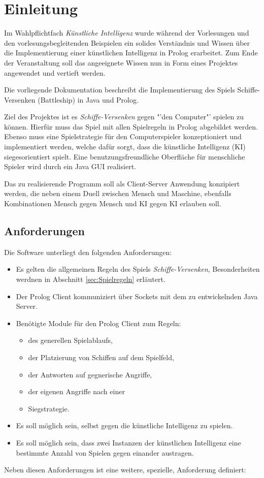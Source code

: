 \section{Einleitung}
\label{sec:Einleitung}
	Im Wahlpflichtfach \textit{Künstliche Intelligenz} wurde während der Vorlesungen und den vorlesungsbegleitenden Beispielen 
	ein solides Verständnis und Wissen über die Implementierung einer künstlichen Intelligenz 
	in Prolog erarbeitet. Zum Ende der Veranstaltung soll das angeeignete Wissen nun in 
	Form eines Projektes angewendet und vertieft werden.
	
	Die vorliegende Dokumentation beschreibt die Implementierung des Spiels Schiffe-Versenken (Battleship)
	in Java und Prolog.
	
	Ziel des Projektes ist es \textit{Schiffe-Versenken} gegen "'den Computer"' spielen zu können. Hierfür muss das Spiel mit allen Spielregeln 
	in Prolog abgebildet werden. Ebenso muss eine Spielstrategie für den Computerspieler konzeptioniert und implementiert werden, 
	welche dafür sorgt, dass die künstliche Intelligenz (KI) siegesorientiert spielt. 
	Eine benutzungsfreundliche Oberfläche für menschliche Spieler wird durch ein Java GUI realisiert.
	
	Das zu realisierende Programm soll als Client-Server Anwendung konzipiert werden, die neben einem Duell zwischen Mensch und Maschine, ebenfalls
	Kombinationen Mensch gegen Mensch und KI gegen KI erlauben soll.
	
	\subsection{Anforderungen} %
	\label{sub:anforderungen}
		Die Software unterliegt den folgenden Anforderungen:
		\begin{itemize}
			\item Es gelten die allgemeinen Regeln des Spiels \textit{Schiffe-Versenken}, Besonderheiten werdnen in Abschnitt \ref{sec:Spielregeln} erläutert.
			\item Der Prolog Client kommuniziert über Sockets mit dem zu entwickelnden Java Server.
			\item Benötigte Module für den Prolog Client zum Regeln:
			\begin{itemize}
				\item des generellen Spielablaufs,
				\item der Platzierung von Schiffen auf dem Spielfeld,
				\item der Antworten auf gegnerische Angriffe,
				\item der eigenen Angriffe nach einer 
				\item Siegstrategie.
			\end{itemize}
			\item Es soll möglich sein, selbst gegen die künstliche Intelligenz zu spielen.
			\item Es soll möglich sein, dass zwei Instanzen der künstlichen Intelligenz eine bestimmte Anzahl von Spielen gegen einander 
			austragen.
		\end{itemize}
		Neben diesen Anforderungen ist eine weitere, spezielle, Anforderung definiert:
		
